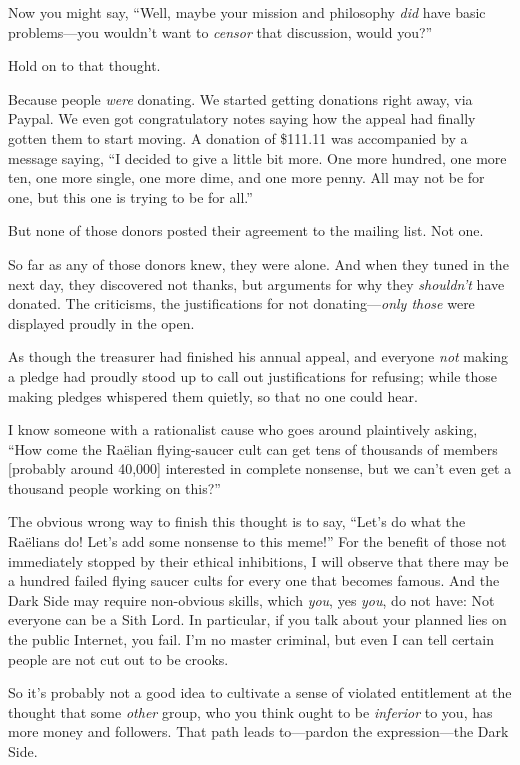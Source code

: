 {
 Now you might say, ``Well, maybe your mission and
philosophy \textit{did} have basic problems---you
wouldn't want to \textit{censor} that discussion, would
you?''}

{
 Hold on to that thought.}

{
 Because people \textit{were} donating. We started getting
donations right away, via Paypal. We even got congratulatory notes
saying how the appeal had finally gotten them to start moving. A
donation of \$111.11 was accompanied by a message saying,
``I decided to give a little bit more. One more
hundred, one more ten, one more single, one more dime, and one more
penny. All may not be for one, but this one is trying to be for
all.''}

{
 But none of those donors posted their agreement to the mailing
list. Not one.}

{
 So far as any of those donors knew, they were alone. And when they
tuned in the next day, they discovered not thanks, but arguments for
why they \textit{shouldn't} have donated. The
criticisms, the justifications for not donating---\textit{only those}
were displayed proudly in the open.}

{
 As though the treasurer had finished his annual appeal, and
everyone \textit{not} making a pledge had proudly stood up to call out
justifications for refusing; while those making pledges whispered them
quietly, so that no one could hear.}

{
 I know someone with a rationalist cause who goes around
plaintively asking, ``How come the Raëlian
flying-saucer cult can get tens of thousands of members [probably
around 40,000] interested in complete nonsense, but we
can't even get a thousand people working on
this?''}

{
 The obvious wrong way to finish this thought is to say,
``Let's do what the Raëlians do!
Let's add some nonsense to this
meme!'' For the benefit of those not immediately
stopped by their ethical inhibitions, I will observe that there may be
a hundred failed flying saucer cults for every one that becomes famous.
And the Dark Side may require non-obvious skills, which \textit{you},
yes \textit{you}, do not have: Not everyone can be a Sith Lord. In
particular, if you talk about your planned lies on the public Internet,
you fail. I'm no master criminal, but even I can tell
certain people are not cut out to be crooks.}

{
 So it's probably not a good idea to cultivate a
sense of violated entitlement at the thought that some \textit{other}
group, who you think ought to be \textit{inferior} to you, has more
money and followers. That path leads to---pardon the expression---the
Dark Side.}

